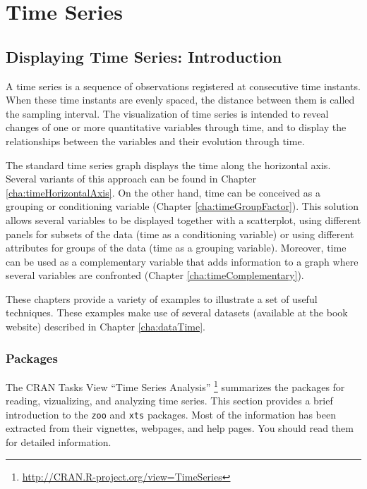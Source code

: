 \part{Time Series}
\label{part:Time}


\chapter{Displaying Time Series: Introduction}
\label{cha:timeIntro}

A time series is a sequence of observations registered at consecutive
time instants. When these time instants are evenly spaced, the
distance between them is called the sampling interval. The
visualization of time series is intended to reveal changes of one or
more quantitative variables through time, and to display the
relationships between the variables and their evolution through time.

The standard time series graph displays the time along the horizontal
axis. Several variants of this approach can be found in Chapter
\ref{cha:timeHorizontalAxis}. On the other hand, time can be conceived
as a grouping or conditioning variable (Chapter
\ref{cha:timeGroupFactor}). This solution allows several variables to
be displayed together with a scatterplot, using different panels for
subsets of the data (time as a conditioning variable) or using
different attributes for groups of the data (time as a grouping
variable). Moreover, time can be used as a complementary variable
that adds information to a graph where several variables are
confronted (Chapter \ref{cha:timeComplementary}).

These chapters provide a variety of examples to illustrate a set of
useful techniques. These examples make use of several datasets
(available at the book website) described in Chapter
\ref{cha:dataTime}.

\section{Packages}
\label{sec:time-series-packages}

The CRAN Tasks View ``Time Series Analysis''
\footnote{\url{http://CRAN.R-project.org/view=TimeSeries}} summarizes
the packages for reading, vizualizing, and analyzing time series. This
section provides a brief introduction to the \texttt{zoo} and
\texttt{xts} packages. Most of the information has been extracted from
their vignettes, webpages, and help pages. You should read them for
detailed information.

